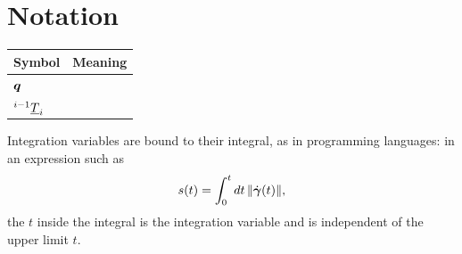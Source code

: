 \chapter*{Notation}

\begin{tabular}{@{}ll@{}}
  \toprule
  Symbol & Meaning \\
  \midrule
  $\bm{q}$          & \\
  ${}^{i-1}\underline{T}_{i}$ & \\
  \bottomrule
\end{tabular}

\medskip
Integration variables are bound to their integral, as in programming
languages: in an expression such as
\[
  s(t) = \int_0^t dt \, \lVert \dot{\bm{\gamma}}(t) \rVert ,
\]
the $t$ inside the integral is the integration variable and is
independent of the upper limit $t$.